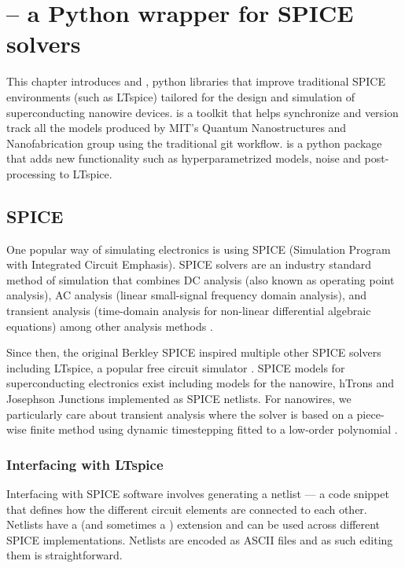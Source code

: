 \begin{sloppypar}
\chapter{ -- a Python wrapper for SPICE solvers}
\end{sloppypar}

This chapter introduces  and , python libraries that improve
traditional SPICE environments (such as LTspice) tailored for the design and simulation of
superconducting nanowire devices.  is a toolkit that helps synchronize and
version track all the models produced by MIT's Quantum Nanostructures and Nanofabrication 
group using the traditional git workflow.  is a python package that adds 
new functionality such as hyperparametrized models, noise and post-processing to LTspice.

\section{SPICE}

One popular way of simulating electronics is using SPICE 
(Simulation Program with Integrated Circuit Emphasis). 
SPICE solvers are an industry standard method of simulation that combines DC analysis (also known as
operating point analysis), AC analysis (linear small-signal frequency domain analysis), and 
transient analysis (time-domain analysis for non-linear differential algebraic equations)
among other analysis methods \cite{spice-og}.

Since then, the original Berkley SPICE
inspired multiple other SPICE solvers including LTspice, a popular free circuit simulator \cite{ltspice-diff-post}. SPICE models for 
superconducting electronics exist including models for the nanowire,
hTrons and Josephson Junctions implemented as SPICE netlists. For nanowires, we
particularly care about transient analysis where the solver
is based on a piece-wise finite method using dynamic timestepping fitted to a 
low-order polynomial \cite{spice-book}.

\subsection{Interfacing with LTspice}%
\label{interfacing_with_ltspice}

Interfacing with SPICE software involves generating a netlist --- a code snippet that defines
how the different circuit elements are connected to each other. Netlists have a  (and 
sometimes a ) extension and can be used across different SPICE implementations. 
Netlists are encoded as ASCII files and as such editing them is straightforward.

